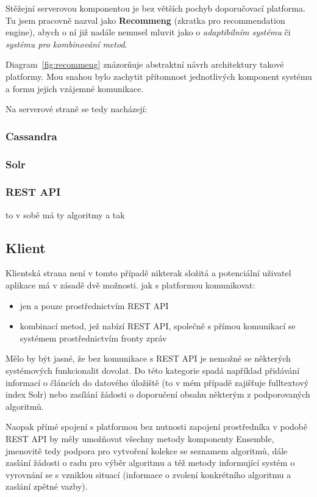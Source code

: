 \documentclass[thesis=M,czech]{FITthesis}[2014/05/07]
\begin{document}
Stěžejní serverovou komponentou je bez větších pochyb doporučovací platforma. Tu jsem pracovně nazval jako \textbf{Recommeng} (zkratka pro recommendation engine), abych o ní již nadále nemusel mluvit jako o \emph{adaptibilním systému} či \emph{systému pro kombinování metod}. 

Diagram~\ref{fig:recommeng} znázorňuje abstraktní návrh architektury takové platformy. Mou snahou bylo zachytit přítomnost jednotlivých komponent systému a formu jejich vzájemné komunikace.

Na serverové straně se tedy nacházejí:

\subsubsection{Cassandra}

\subsubsection{Solr}

\subsubsection{REST API}

to v sobě má ty algoritmy a tak

\subsection{Klient}

Klientská strana není v tomto případě nikterak složitá a potenciální uživatel aplikace má v zásadě dvě možnosti. jak s platformou komunikovat:

\begin{itemize}
	\item jen a pouze prostřednictvím REST API
	\item kombinací metod, jež nabízí REST API, společně s přímou komunikací se systémem prostřednictvím fronty zpráv
\end{itemize}

Mělo by být jasné, že bez komunikace s REST API je nemožné se některých systémových funkcionalit dovolat. Do této kategorie spadá například přidávání informací o článcích do datového úložiště (to v mém případě zajišťuje fulltextový index Solr) nebo zasílání žádosti o doporučení obsahu některým z podporovaných algoritmů. 

Naopak přímé spojení s platformou bez nutnosti zapojení prostředníka v podobě REST API by měly umožňovat všechny metody komponenty Ensemble, jmenovitě tedy podpora pro vytvoření kolekce se seznamem algoritmů, dále zaslání žádosti o radu pro výběr algoritmu a též metody informující systém o vyrovnání se s vzniklou situací (informace o zvolení konkrétního algoritmu a zaslání zpětné vazby). 
\end{document}
